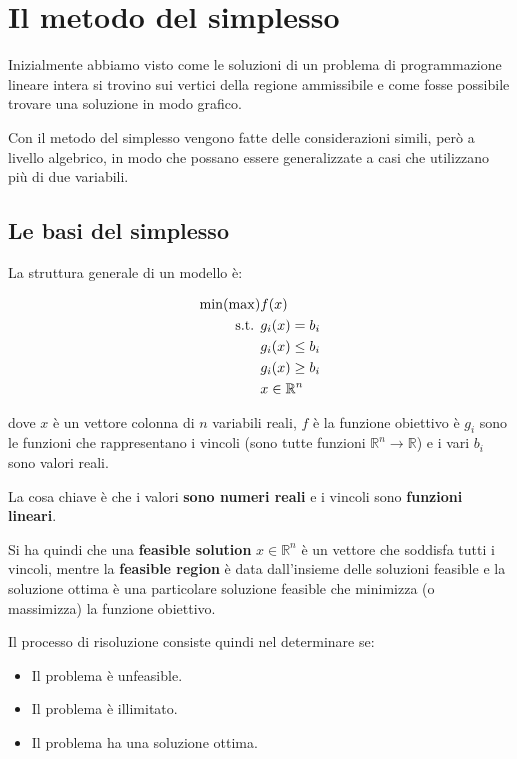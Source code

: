 
\chapter{Il metodo del simplesso}

Inizialmente abbiamo visto come le soluzioni di un problema di programmazione lineare intera si trovino sui vertici della regione ammissibile e come fosse possibile trovare una soluzione in modo grafico.

Con il metodo del simplesso vengono fatte delle considerazioni simili, però a livello algebrico, in modo che possano essere generalizzate a casi che utilizzano più di due variabili.

\section{Le basi del simplesso}

La struttura generale di un modello è:

\begin{align*}
	\min(\max) &f(x) \\
		\text{s.t. } &g_i(x) = b_i \\
			&g_i(x) \leq b_i \\
			&g_i(x) \geq b_i \\
			&x \in \mathbb{R}^n
\end{align*}

\noindent dove $x$ è un vettore colonna di $n$ variabili reali, $f$ è la funzione obiettivo è $g_i$ sono le funzioni che rappresentano i vincoli (sono tutte funzioni $\mathbb{R}^n \to \mathbb{R}$) e i vari $b_i$ sono valori reali.

La cosa chiave è che i valori \textbf{sono numeri reali} e i vincoli sono \textbf{funzioni lineari}.

Si ha quindi che una \textbf{feasible solution} $x \in \mathbb{R}^n$ è un vettore che soddisfa tutti i vincoli, mentre la \textbf{feasible region} è data dall'insieme delle soluzioni feasible e la soluzione ottima è una particolare soluzione feasible che minimizza (o massimizza) la funzione obiettivo.

Il processo di risoluzione consiste quindi nel determinare se:

\begin{itemize}
	\item Il problema è unfeasible.
	\item Il problema è illimitato.
	\item Il problema ha una soluzione ottima.
\end{itemize}

